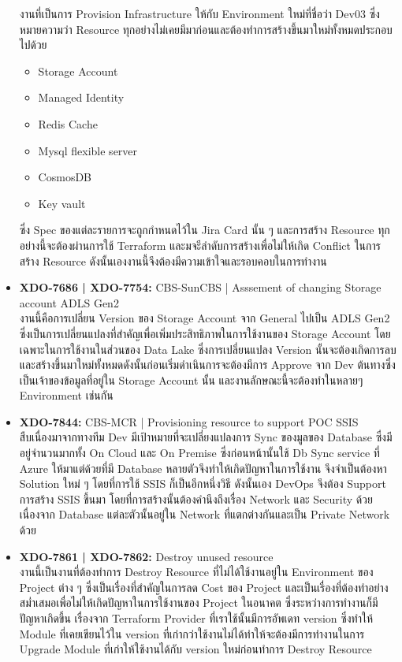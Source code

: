 \begin{itemize}
            งานที่เป็นการ Provision Infrastructure ให้กับ Environment ใหม่ที่ชื่อว่า Dev03 ซึ่งหมายความว่า Resource ทุกอย่างไม่เคยมีมาก่อนและต้องทำการสร้างขึ้นมาใหม่ทั้งหมดประกอบไปด้วย
            \begin{itemize}
                  \item Storage Account
                  \item Managed Identity
                  \item Redis Cache
                  \item Mysql flexible server
                  \item CosmosDB
                  \item Key vault
            \end{itemize}
            ซึ่ง Spec ของแต่ละรายการจะถูกกำหนดไว้ใน Jira Card นั้น ๆ และการสร้าง Resource ทุกอย่างนี้จะต้องผ่านการใช้ Terraform และมจะีลำดับการสร้างเพื่อไม่ให้เกิด Conflict ในการสร้าง Resource ดังนั้นเองงานนี้จึงต้องมีความเข้าใจและรอบคอบในการทำงาน
      \item \textbf{XDO-7686 | XDO-7754:} CBS-SunCBS | Asssement of changing Storage account ADLS Gen2\\
            งานนี้คือการเปลี่ยน Version ของ Storage Account จาก General ไปเป็น ADLS Gen2 ซึ่งเป็นการเปลี่ยนแปลงที่สำคัญเพื่อเพิ่มประสิทธิภาพในการใช้งานของ Storage Account โดยเฉพาะในการใช้งานในส่วนของ Data Lake ซึ่งการเปลี่ยนแปลง Version นั้นจะต้องเกิดการลบและสร้างขึ้นมาใหม่ทั้งหมดดังนั้นก่อนเริ่มดำเนินการจะต้องมีการ Approve จาก Dev ต้นทางซึ่งเป็นเจ้าของข้อมูลที่อยู่ใน Storage Account นั้น และงานลักษณะนี้จะต้องทำในหลายๆ Environment เช่นกัน
      \item \textbf{XDO-7844:} CBS-MCR | Provisioning resource to support POC SSIS\\
            สืบเนื่องมาจากทางทีม Dev มีเป้าหมายที่จะเปลี่ยงแปลงการ Sync ของมูลของ Database ซึ่งมีอยู่จำนวนมากทั้ง On Cloud และ On Premise ซึ่งก่อนหน้านั้นใช้ Db Sync service ที่ Azure ให้มาแต่ด้วยที่มี Database หลายตัวจึงทำให้เกิดปัญหาในการใช้งาน จึงจำเป็นต้องหา Solution ใหม่ ๆ โดยที่การใช้ SSIS ก็เป็นอีกหนึ่งวิธี ดังนั้นเอง DevOps จึงต้อง Support การสร้าง SSIS ขึ้นมา โดยที่การสร้างนั้นต้องคำนึงถึงเรื่อง Network และ Security ด้วยเนื่องจาก Database แต่ละตัวนั้นอยู่ใน Network ที่แตกต่างกันและเป็น Private Network ด้วย
      \clearpage
      \item \textbf{XDO-7861 | XDO-7862: } Destroy unused resource\\
            งานนี้เป็นงานที่ต้องทำการ Destroy Resource ที่ไม่ได้ใช้งานอยู่ใน Environment ของ Project ต่าง ๆ ซึ่งเป็นเรื่องที่สำคัญในการลด Cost ของ Project และเป็นเรื่องที่ต้องทำอย่างสม่ำเสมอเพื่อไม่ให้เกิดปัญหาในการใช้งานของ Project ในอนาคต ซึ่งระหว่างการทำงานก็มีปัญหาเกิดขึ้น เรื่องจาก Terraform Provider ที่เราใช้นั้นมีการอัพเดท version ซึ่งทำให้ Module ที่เคยเขียนไว้ใน version ที่เก่ากว่าใช้งานไม่ได้ทำให้จะต้องมีการทำงานในการ Upgrade Module ที่เก่าให้ใช้งานได้กับ version ใหม่ก่อนทำการ Destroy Resource

\end{itemize}

